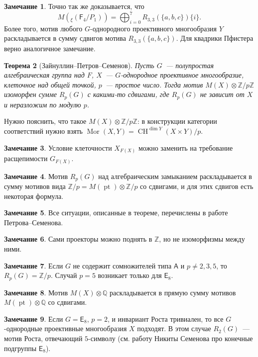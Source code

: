 \documentclass[a4paper]{article}
\DeclareMathOperator{\CH}{CH}
\DeclareMathOperator{\pt}{pt}
\DeclareMathOperator{\Mor}{Mor}
\newtheorem{theorem}{Теорема}[subsection]
\theoremstyle{definition}
\newtheorem{remark}[theorem]{Замечание}
\begin{document}
\begin{remark}
Точно так же доказывается, что
\[
M({}_{\xi}(\mathsf{F}_4/P_1)) = \bigoplus_{i=0}^{7}
R_{3,3}(\{a,b,c\})\{i\}.
\]
Более того, мотив любого $G$-однородного проективного
многообразия $Y$ раскладывается в сумму сдвигов
мотива $R_{3,3}(\{a,b,c\})$.
Для квадрики Пфистера верно аналогичное замечание.
\end{remark}

\begin{theorem}[Зайнуллин--Петров--Семенов]\label{thm:ZPS}
Пусть $G$~--- полупростая алгебраическая группа над $F$,
$X$~--- $G$-однородное проективное многообразие, клеточное
над общей точкой, $p$~--- простое число.
Тогда мотив $M(X)\otimes\mathbb{Z}/p\mathbb{Z}$ изоморфен
сумме $R_p(G)$ с какими-то сдвигами,
где $R_p(G)$ не зависит от $X$ и неразложим по модулю $p$.
\end{theorem}
Нужно пояснить, что такое $M(X)\otimes\mathbb{Z}/p\mathbb{Z}$:
в конструкции категории соответствий нужно взять
$\Mor(X,Y) = \CH^{\dim Y}(X\times Y) / p$.

\begin{remark}
Условие клеточности $X_{F(X)}$ можно заменить
на требование расщепимости $G_{F(X)}$.
\end{remark}
\begin{remark}
Мотив $R_p(G)$ над алгебраическим замыканием раскладывается
в сумму мотивов вида $\mathbb{Z}/p = M(\pt)\otimes\mathbb{Z}/p$
со сдвигами, и для этих сдвигов есть некоторая формула.
\end{remark}
\begin{remark}
Все ситуации, описанные в теореме, перечислены в работе
Петрова--Семенова.
\end{remark}
\begin{remark}
Сами проекторы можно поднять в $\mathbb{Z}$, но не изоморфизмы
между ними.
\end{remark}
\begin{remark}
Если $G$ не содержит сомножителей типа $\mathsf{A}$
и $p\neq 2,3,5$, то $R_p(G) = \mathbb{Z}/p$.
Случай $p=5$ возникает только для $\mathsf{E}_8$.
\end{remark}
\begin{remark}
Мотив $M(X)\otimes\mathbb{Q}$ раскладывается в
прямую сумму мотивов $M(\pt)\otimes\mathbb{Q}$ со сдвигами.
\end{remark}
\begin{remark}
Если $G=\mathsf{E}_8$, $p=2$, и инвариант Роста
тривиален, то все $G$-однородные проективные многообразия $X$
подходят.
В этом случае $R_2(G)$~--- мотив Роста,
отвечающий $5$-символу (см. работу Никиты Семенова
про конечные подгруппы $\mathsf{E}_8$).
\end{remark}
\end{document}
